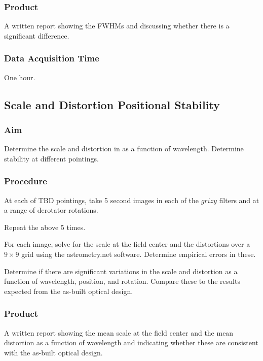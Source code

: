\documentclass{article}
\begin{document}
\subsubsection{Product}

A written report showing the FWHMs and discussing whether there is a significant difference.

\subsubsection{Data Acquisition Time}

One hour.


\subsection{Scale and Distortion Positional Stability}

\subsubsection{Aim}

Determine the scale and distortion in as a function of wavelength. Determine stability at different pointings.

\subsubsection{Procedure}

At each of TBD pointings, take 5 second images in each of the $grizy$ filters and at a range of derotator rotations. 

Repeat the above 5 times.

For each image, solve for the scale at the field center and the distortions over a $9\times9$ grid using the astrometry.net software. Determine empirical errors in these.

Determine if there are significant variations in the scale and distortion as a function of wavelength, position, and rotation. Compare these to the results expected from the as-built optical design.

\subsubsection{Product}

A written report showing the mean scale at the field center and the mean distortion as a function of wavelength and indicating whether these are consistent with the as-built optical design.
\end{document}
